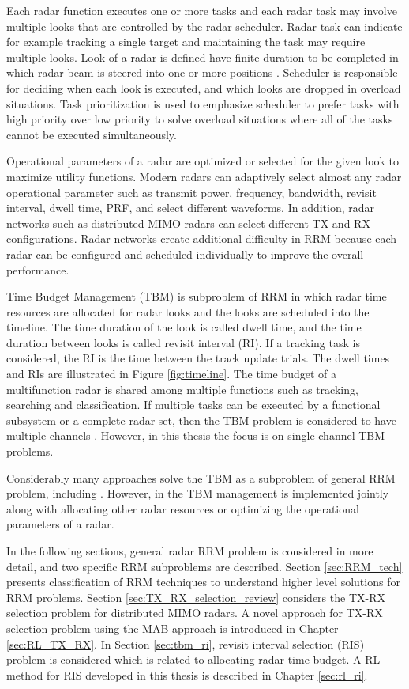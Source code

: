 \documentclass[english, 12pt, a4paper, elec, utf8, a-1b, online]{aaltothesis}
\begin{document}
Each radar function executes one or more tasks and each radar task may involve multiple looks that are controlled by the radar scheduler.
Radar task can indicate for example tracking a single target and maintaining the task may require multiple looks.
Look of a radar is defined have finite duration to be completed in which radar beam is steered into one or more positions \cite{Moo2016}.
Scheduler is responsible for deciding when each look is executed, and which looks are dropped in overload situations. 
Task prioritization is used to emphasize scheduler to prefer tasks with high priority over low priority to solve overload situations where all of the tasks cannot be executed simultaneously.

Operational parameters of a radar are optimized or selected for the given look to maximize utility functions. 
Modern radars can adaptively select almost any radar operational parameter such as transmit power, frequency, bandwidth, revisit interval, dwell time, PRF, and select different waveforms. 
In addition, radar networks such as distributed MIMO radars can select different TX and RX configurations. 
Radar networks create additional difficulty in RRM because each radar can be configured and scheduled individually to improve the overall performance.

Time Budget Management (TBM) is subproblem of RRM in which radar time resources are allocated for radar looks and the looks are scheduled into the timeline. 
The time duration of the look is called dwell time, and the time duration between looks is called revisit interval (RI). 
If a tracking task is considered, the RI is the time between the track update trials. 
The dwell times and RIs are illustrated in Figure \ref{fig:timeline}. 
The time budget of a multifunction radar is shared among multiple functions such as tracking, searching and classification.
If multiple tasks can be executed by a functional subsystem or a complete radar set, then the TBM problem is considered to have multiple channels \cite{Shaghaghi2018}.
However, in this thesis the focus is on single channel TBM problems.

Considerably many approaches solve the TBM as a subproblem of general RRM problem, including \cite{Koch1999, Wintenby2006, Byrne2016, Xu2010}. 
However, in \cite{Rajkumar1997, Irci2010, Charlish2015a} the TBM management is implemented jointly along with allocating other radar resources or optimizing the operational parameters of a radar.


In the following sections, general radar RRM problem is considered in more detail, and two specific RRM subproblems are described.
Section \ref{sec:RRM_tech} presents classification of RRM techniques to understand higher level solutions for RRM problems.
Section \ref{sec:TX_RX_selection_review} considers the TX-RX selection problem for distributed MIMO radars. 
A novel approach for TX-RX selection problem using the MAB approach is introduced in Chapter \ref{sec:RL_TX_RX}.
In Section \ref{sec:tbm_ri}, revisit interval selection (RIS) problem is considered which is related to allocating radar time budget.
A RL method for RIS developed in this thesis is described in Chapter \ref{sec:rl_ri}.
\end{document}
